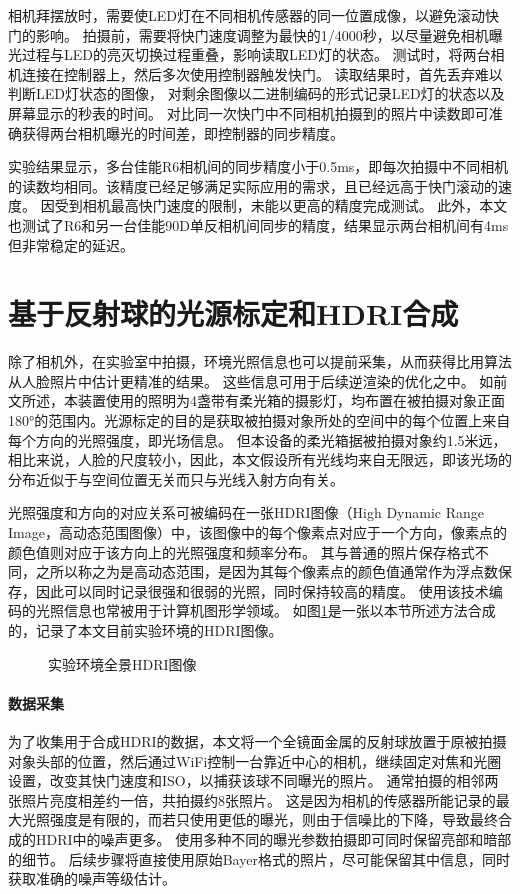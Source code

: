 相机拜摆放时，需要使LED灯在不同相机传感器的同一位置成像，以避免滚动快门的影响。
拍摄前，需要将快门速度调整为最快的1/4000秒，以尽量避免相机曝光过程与LED的亮灭切换过程重叠，影响读取LED灯的状态。
测试时，将两台相机连接在控制器上，然后多次使用控制器触发快门。
读取结果时，首先丢弃难以判断LED灯状态的图像，
对剩余图像以二进制编码的形式记录LED灯的状态以及屏幕显示的秒表的时间。
对比同一次快门中不同相机拍摄到的照片中读数即可准确获得两台相机曝光的时间差，即控制器的同步精度。

实验结果显示，多台佳能R6相机间的同步精度小于0.5ms，即每次拍摄中不同相机的读数均相同。该精度已经足够满足实际应用的需求，且已经远高于快门滚动的速度。
因受到相机最高快门速度的限制，未能以更高的精度完成测试。
此外，本文也测试了R6和另一台佳能90D单反相机间同步的精度，结果显示两台相机间有4ms但非常稳定的延迟。



\section{基于反射球的光源标定和HDRI合成}

除了相机外，在实验室中拍摄，环境光照信息也可以提前采集，从而获得比用算法从人脸照片中估计更精准的结果。
这些信息可用于后续逆渲染的优化之中。
如前文所述，本装置使用的照明为4盏带有柔光箱的摄影灯，均布置在被拍摄对象正面180°的范围内。光源标定的目的是获取被拍摄对象所处的空间中的每个位置上来自每个方向的光照强度，即光场信息。
但本设备的柔光箱据被拍摄对象约1.5米远，相比来说，人脸的尺度较小，因此，本文假设所有光线均来自无限远，即该光场的分布近似于与空间位置无关而只与光线入射方向有关。

光照强度和方向的对应关系可被编码在一张HDRI图像（High Dynamic Range Image，高动态范围图像）中，该图像中的每个像素点对应于一个方向，像素点的颜色值则对应于该方向上的光照强度和频率分布。
其与普通的照片保存格式不同，之所以称之为是高动态范围，是因为其每个像素点的颜色值通常作为浮点数保存，因此可以同时记录很强和很弱的光照，同时保持较高的精度。
使用该技术编码的光照信息也常被用于计算机图形学领域。
如图\ref{fig:HDRI}是一张以本节所述方法合成的，记录了本文目前实验环境的HDRI图像。
\begin{figure}
\centering
{}
\caption{实验环境全景HDRI图像}
\label{fig:HDRI}
\end{figure}

\paragraph{数据采集}
为了收集用于合成HDRI的数据，本文将一个全镜面金属的反射球放置于原被拍摄对象头部的位置，然后通过WiFi控制一台靠近中心的相机，继续固定对焦和光圈设置，改变其快门速度和ISO，以捕获该球不同曝光的照片。
通常拍摄的相邻两张照片亮度相差约一倍，共拍摄约8张照片。
这是因为相机的传感器所能记录的最大光照强度是有限的，而若只使用更低的曝光，则由于信噪比的下降，导致最终合成的HDRI中的噪声更多。
使用多种不同的曝光参数拍摄即可同时保留亮部和暗部的细节。
后续步骤将直接使用原始Bayer格式的照片，尽可能保留其中信息，同时获取准确的噪声等级估计。

